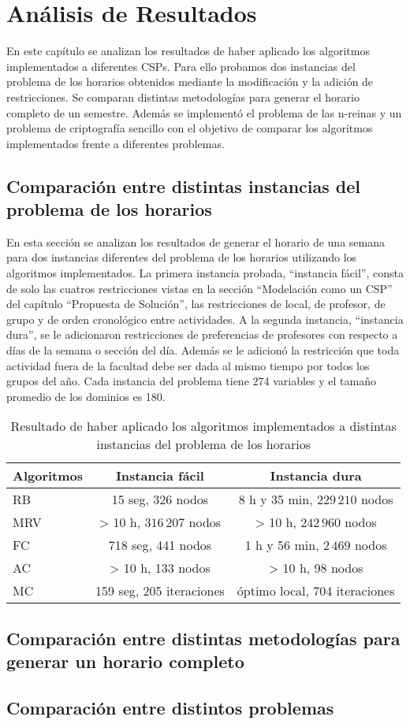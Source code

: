 \chapter{An\'alisis de Resultados}

En este cap\'itulo se analizan los resultados de haber aplicado los algoritmos implementados a diferentes CSPs. Para ello probamos dos instancias del problema de los horarios obtenidos mediante la modificaci\'on y la adici\'on de restricciones. Se comparan distintas metodolog\'ias para generar el horario completo de un semestre. Adem\'as se implement\'o el problema de las n-reinas y un problema de criptograf\'ia sencillo con el objetivo de comparar los algoritmos implementados frente a diferentes problemas.

\section{Comparaci\'on entre distintas instancias del problema de los horarios}

En esta secci\'on se analizan los resultados de generar el horario de una semana para dos instancias diferentes del problema de los horarios utilizando los algoritmos implementados. La primera instancia probada, ``instancia f\'acil'', consta de solo las cuatros restricciones vistas en la secci\'on ``Modelaci\'on como un CSP'' del cap\'itulo ``Propuesta de Solución'', las restricciones de local, de profesor, de grupo y de orden cronol\'ogico entre actividades. A la segunda instancia, ``instancia dura'', se le adicionaron restricciones de preferencias de profesores con respecto a d\'ias de la semana o secci\'on del d\'ia. Adem\'as se le adicion\'o la restricci\'on que toda actividad fuera de la facultad debe ser dada al mismo tiempo por todos los grupos del año. Cada instancia del problema tiene 274 variables y el tamaño promedio de los dominios es 180.

\begin{table}[h]
	\caption{Resultado de haber aplicado los algoritmos implementados a distintas instancias del problema de los horarios}
	\begin{center}
		\label{1semana}
		\begin{tabular}{l|c|c}
			Algoritmos & Instancia f\'acil & Instancia dura \\ \hline
			RB & 15 seg, 326 nodos & 8 h y 35 min, $229\,210$ nodos\\
			MRV & > 10 h, $316\,207$ nodos &  > 10 h, $242\,960$ nodos\\
			FC & 718 seg, 441 nodos & 1 h y 56 min, $2\,469$ nodos \\
			AC & > 10 h, 133 nodos &  > 10 h, 98 nodos \\
			MC & 159 seg, 205 iteraciones & \'optimo local, 704 iteraciones
		\end{tabular}
	\end{center}
\end{table}

\section{Comparaci\'on entre distintas metodolog\'ias para generar un horario completo}

\section{Comparaci\'on entre distintos problemas}